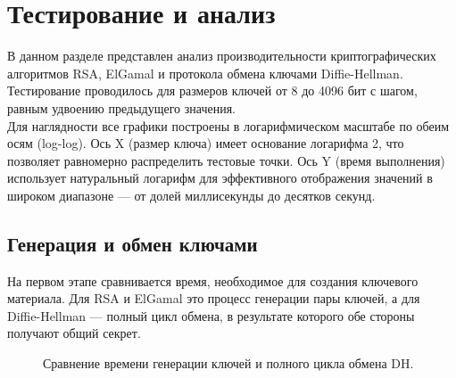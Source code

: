 \section{Тестирование и анализ}

В данном разделе представлен анализ производительности криптографических алгоритмов RSA, ElGamal и протокола обмена ключами Diffie-Hellman. Тестирование проводилось для размеров ключей от 8 до 4096 бит с шагом, равным удвоению предыдущего значения. \\

\noindent Для наглядности все графики построены в логарифмическом масштабе по обеим осям (log-log). Ось X (размер ключа) имеет основание логарифма 2, что позволяет равномерно распределить тестовые точки. Ось Y (время выполнения) использует натуральный логарифм для эффективного отображения значений в широком диапазоне — от долей миллисекунды до десятков секунд.

\subsection{Генерация и обмен ключами}
На первом этапе сравнивается время, необходимое для создания ключевого материала. Для RSA и ElGamal это процесс генерации пары ключей, а для Diffie-Hellman — полный цикл обмена, в результате которого обе стороны получают общий секрет.

\begin{figure}[h!]
\centering
{}
\caption{Сравнение времени генерации ключей и полного цикла обмена DH.}
\label{fig:key_generation}
\end{figure}

